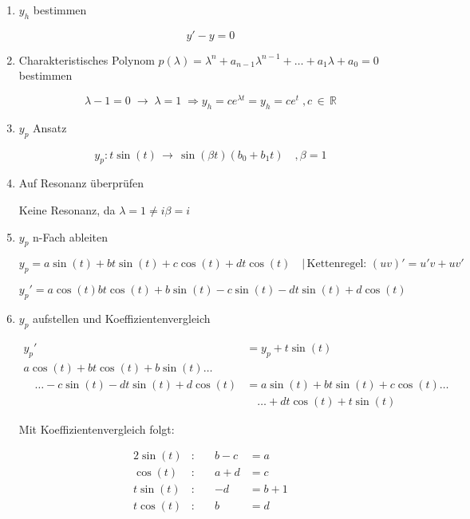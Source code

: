 \documentclass[a4paper,11pt,oneside,open=any,parskip=half, DIV=15]{scrreprt}
\begin{document}
      \begin{enumerate}
         \item \(y_h\) bestimmen
         
            \[
               y' - y = 0
            \]

         \item Charakteristisches Polynom \(p(\lambda) = \lambda^n + a_{n-1}\lambda^{n-1} + \ldots + a_1\lambda + a_0 = 0\) bestimmen  %
         
            \[
               \lambda - 1 = 0 \; \rightarrow \; \lambda = 1 \; \Rightarrow y_h = ce^{\lambda t} = y_h = ce^{t} \;, c \, \in \, \mathbb{R}
            \]

         \item \(y_p\) Ansatz
         
            \[
               y_p : t\sin(t) \, \rightarrow \, \sin(\beta t)(b_0 + b_1 t) \quad ,\beta = 1
            \]

         \item Auf Resonanz überprüfen
            
            Keine Resonanz, da \(\lambda = 1 \neq i\beta = i\)
         
         \item \(y_p\) n-Fach ableiten
         
            \[
               y_p = a\sin(t) + bt\sin(t) + c\cos(t) + dt\cos(t) \quad \vert \,  \text{Kettenregel: } (uv)' = u'v + uv'
            \]

            \[
               y_p' = a\cos(t) bt\cos(t) + b\sin(t) - c\sin(t) - dt\sin(t) + d\cos(t)
            \]

         \item \(y_p\) aufstellen und Koeffizientenvergleich
         
            \begin{align*}
               y_p' &= y_p + t\sin(t) \\
               a\cos(t) + bt\cos(t) + b\sin(t) \ldots &\\
               \quad \ldots - c\sin(t) - dt\sin(t) + d\cos(t) &= a\sin(t) + bt\sin(t) + c\cos(t) \ldots \\
               &\quad \ldots + dt\cos(t) + t\sin(t)
            \end{align*}

            Mit Koeffizientenvergleich folgt:

            \begin{alignat*}{2}
               \sin(t) &: \quad & b - c &= a \\
               \cos(t) &: \quad & a + d &= c \\
               t\sin(t) &: \quad & -d &= b + 1 \\
               t\cos(t) &: \quad & b &= d \\
            \end{alignat*}
               

\end{enumerate}
\end{document}
